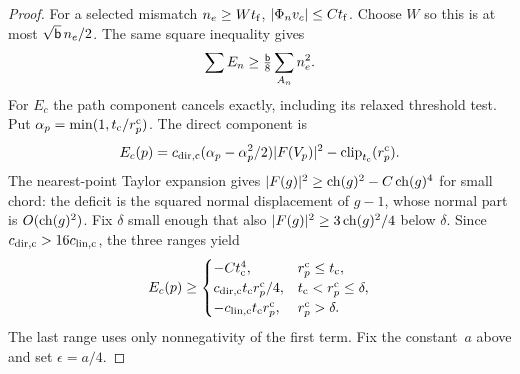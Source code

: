 \begin{proof}
For a selected mismatch $n_e\ge Wt_{\rm f}$, $|\Phi_nv_c|\le Ct_{\rm f}$. Choose $W$ so this is at most $\sqrt{\mathsf{b}}\,n_e/2$. The same square inequality gives
\begin{equation*}
\sum E_n\ge\tfrac{\mathsf{b}}{8}\sum_{A_n}n_e^2.
\end{equation*}
For $E_c$ the path component cancels exactly, including its relaxed threshold test. Put $\alpha_p=\min(1,t_{\rm c}/r^{\rm c}_p)$. The direct component is
\begin{equation*}
E_c(p)=c_{{\rm dir},{\rm c}}(\alpha_p-\alpha_p^2/2)|F(V_p)|^2-\operatorname{clip}_{t_{\rm c}}(r^{\rm c}_p).
\end{equation*}
The nearest-point Taylor expansion gives $|F(g)|^2\ge\operatorname{ch}(g)^2-C\operatorname{ch}(g)^4$ for small chord: the deficit is the squared normal displacement of $g-1$, whose normal part is $O(\operatorname{ch}(g)^2)$. Fix $\delta$ small enough that also $|F(g)|^2\ge3\operatorname{ch}(g)^2/4$ below $\delta$. Since $c_{{\rm dir},{\rm c}}>16c_{{\rm lin},{\rm c}}$, the three ranges yield
\begin{equation*}
E_c(p)\ge\begin{cases}-C t_{\rm c}^4,&r^{\rm c}_p\le t_{\rm c},\\
c_{{\rm dir},{\rm c}}t_{\rm c}r^{\rm c}_p/4,&t_{\rm c}<r^{\rm c}_p\le\delta,\\
-c_{{\rm lin},{\rm c}}t_{\rm c}r^{\rm c}_p,&r^{\rm c}_p>\delta.
\end{cases}
\end{equation*}
The last range uses only nonnegativity of the first term. Fix the constant~$a$ above and set $\epsilon=a/4$.


\end{proof}
